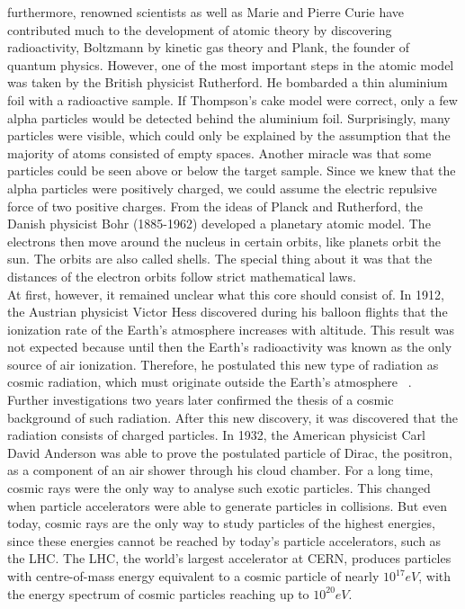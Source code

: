 furthermore, renowned scientists as well as Marie and Pierre Curie have contributed much to the development of atomic theory by discovering radioactivity, Boltzmann by kinetic gas theory and Plank, the founder of quantum physics.
However, one of the most important steps in the atomic model was taken by the British physicist Rutherford. He bombarded a thin aluminium foil with a radioactive sample. If Thompson's cake model were correct, only a few alpha particles would be detected behind the aluminium foil. Surprisingly, many particles were visible, which could only be explained by the assumption that the majority of atoms consisted of empty spaces. Another miracle was that some particles could be seen above or below the target sample. Since we knew that the alpha particles were positively charged, we could assume the electric repulsive force of two positive charges. From the ideas of Planck and Rutherford, the Danish physicist Bohr (1885-1962) developed a planetary atomic model. The electrons then move around the nucleus in certain orbits, like planets orbit the sun. The orbits are also called shells. The special thing about it was that the distances of the electron orbits follow strict mathematical laws.\\  
At first, however, it remained unclear what this core should consist of. \cite{haken2013atom, demtroder2005experimentalphysik}   
In 1912, the Austrian physicist Victor Hess discovered during his balloon flights that the ionization rate of the Earth's atmosphere increases with altitude. This result was not expected because until then the Earth's radioactivity was known as the only source of air ionization. Therefore, he postulated this new type of radiation as cosmic radiation, which must originate outside the Earth's atmosphere ~\cite{Ender}.\\
Further investigations two years later confirmed the thesis of a cosmic background of such radiation. After this new discovery, it was discovered that the radiation consists of charged particles. In 1932, the American physicist Carl David Anderson was able to prove the postulated particle of Dirac, the positron, as a component of an air shower through his cloud chamber. For a long time, cosmic rays were the only way to analyse such exotic particles.\cite{Bluemer:2009zf}
This changed when particle accelerators were able to generate particles in collisions. But even today, cosmic rays are the only way to study particles of the highest energies, since these energies cannot be reached by today's particle accelerators, such as the LHC. The LHC, the world's largest accelerator at CERN, produces particles with centre-of-mass energy equivalent to a cosmic particle of nearly $10^{17} eV $, with the energy spectrum of cosmic particles reaching up to $10^{20} eV $.
